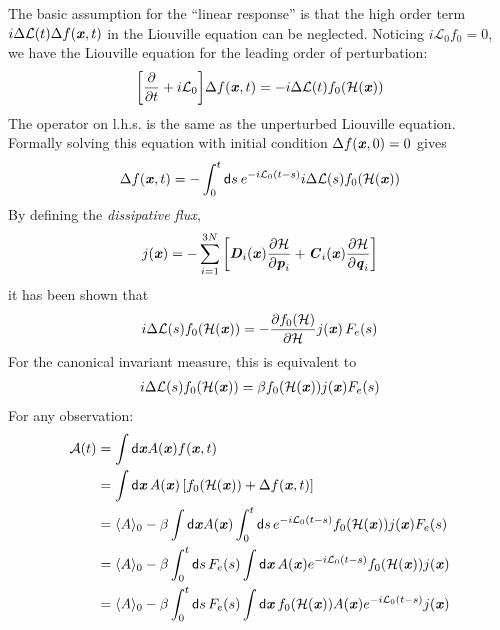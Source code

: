 \documentclass[aip,jcp,a4paper,reprint,onecolumn]{revtex4-1}
\newcommand{\vect}[1]{\textbf{\textit{#1}}}
\newcommand{\dd}{\textsf{d}}
\newcommand{\mh}{\mathcal H}
\newcommand{\ml}{\mathcal L}
\begin{document}
The basic assumption for the ``linear response'' is that the high order
term $i\Delta\ml(t)  \Delta  f(\vect x, t)$ in the Liouville equation
can be neglected. Noticing $i\ml_0 f_0 = 0$, we have the Liouville equation
for the leading order of perturbation:
\begin{align}
  \bigg[
  \frac{\partial}{\partial t}
  + i\ml_0
  \bigg]
  \Delta  f(\vect x, t)
  =
  - i\Delta\ml(t) f_0(\mh(\vect x))
\end{align}
The operator on l.h.s. is the same as the unperturbed Liouville equation.
Formally solving this equation with initial condition
$\Delta f(\vect x, 0) = 0$ gives
\begin{align}
  \Delta  f(\vect x, t) =
  - \int_0^t \dd s \:
  e^{-i\ml_0(t-s)}
  i\Delta\ml(s)f_0(\mh(\vect x))
\end{align}
By defining the \emph{dissipative flux},
\begin{align}
  j(\vect x) =
  -\sum_{i=1}^{3N}
  \bigg[
  \vect D_i(\vect x) \frac{\partial\mh}{\partial \vect p_i} +
  \vect C_i(\vect x) \frac{\partial\mh}{\partial \vect q_i}   
  \bigg]
\end{align}
it has been shown that~\cite{tuckeman2010statistical}
\begin{align}
  i\Delta\ml(s)f_0(\mh(\vect x)) =
  -\frac{\partial f_0(\mh)}{\partial\mh} j(\vect x)\,F_e(s)
\end{align}
For the canonical invariant measure, this is equivalent to
\begin{align}
  i\Delta\ml(s)f_0(\mh(\vect x)) =
  \beta f_0(\mh(\vect x)) j(\vect x)F_e(s)
\end{align}
For any observation:
\begin{align}\nonumber
  \mathcal A(t)
  &=
  \int\dd \vect x A(\vect x)f(\vect x, t)  \\\nonumber
  &=
  \int\dd \vect x\, A(\vect x)\,
  [f_0(\mh(\vect x)) + \Delta f(\vect x, t)] \\\nonumber
  &=
  \langle A\rangle_0
  -
  \beta
  \int \dd \vect x
  A(\vect x)
  \int_0^t\dd s\,
  e^{-i\ml_0(t-s)}
  f_0(\mh(\vect x)) j(\vect x)F_e(s)  \\\nonumber
  &=
  \langle A\rangle_0
  -
  \beta
  \int_0^t\dd s\,
  F_e(s)
  \int \dd \vect x\,
  A(\vect x)
  e^{-i\ml_0(t-s)}
  f_0(\mh(\vect x)) j(\vect x)  \\
  &=
  \langle A\rangle_0
  -
  \beta
  \int_0^t\dd s\,
  F_e(s)
  \int \dd \vect x\,
  f_0(\mh(\vect x))
  A(\vect x)
  e^{-i\ml_0(t-s)}
  j(\vect x)  
\end{align}
\end{document}
